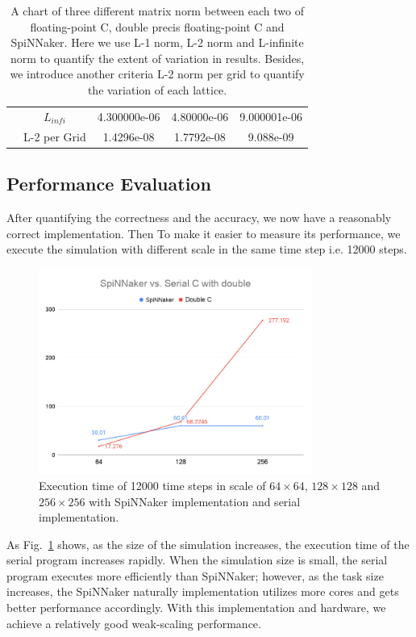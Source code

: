 \begin{table}[tb]
\begin{tabular}{|c|c|c|c|c|}
                     & $L_{infi}$  & 4.300000e-06         & 4.80000e-06           & 9.000001e-06           \\ \cline{2-5} 
                     & L-2 per Grid & 1.4296e-08           & 1.7792e-08            & 9.088e-09              \\ \hline
\end{tabular}
\caption{A chart of three different matrix norm between each two of floating-point C, double precis floating-point C and SpiNNaker. Here we use L-1 norm, L-2 norm and L-infinite norm to quantify the extent of variation in results. Besides, we introduce another criteria L-2 norm per grid to quantify the variation of each lattice.}
\label{table:norm}
\end{table}

\subsection{Performance Evaluation} \label{sec:perfe}
After quantifying the correctness and the accuracy, we now have a reasonably correct implementation. Then To make it easier to measure its performance, we execute the simulation with different scale in the same time step i.e. 12000 steps.\\

\begin{figure}[tb]
   \centering
       \includegraphics[width=0.8\textwidth]{figures/SpiNNaker vs. Serial C with double.png}
       \caption{Execution time of 12000 time steps in scale of $64\times64$, $128\times128$ and $256\times256$ with SpiNNaker implementation and serial implementation.}
       \label{fig:performance}
\end{figure}

As Fig.~\ref{fig:performance} shows, as the size of the simulation increases, the execution time of the serial program increases rapidly. When the simulation size is small, the serial program executes more efficiently than SpiNNaker; however, as the task size increases, the SpiNNaker naturally implementation utilizes more cores and gets better performance accordingly. With this implementation and hardware, we achieve a relatively good weak-scaling performance.\\


